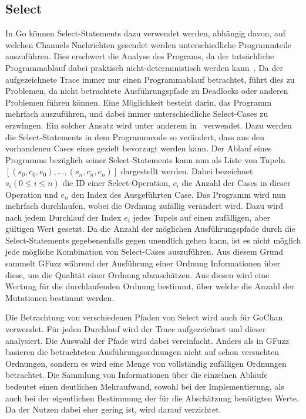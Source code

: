 \subsection{Select}\label{Chap:Back-Sec:Select}
In Go können Select-Statements dazu verwendet werden, abhängig davon, 
auf welchen Channels Nachrichten gesendet werden unterschiedliche Programmteile
auszuführen. Dies erschwert die Analyse des Programs, da der 
tatsächliche Programmablauf dabei praktisch nicht-deterministisch werden 
kann~\cite{select-spec}. Da der aufgezeichnete Trace immer nur einen 
Programmablauf betrachtet, führt dies zu Problemen, da 
nicht betrachtete Ausführungspfade zu Deadlocks oder anderen Problemen 
führen können. Eine Möglichkeit besteht darin, das Programm mehrfach auszuführen, 
und dabei immer unterschiedliche Select-Cases zu erzwingen. Ein solcher 
Ansatz wird unter anderem in~\cite{gfuzz} verwendet. Dazu werden die 
Select-Statements in dem Programmcode so verändert, dass aus den vorhandenen 
Cases eines gezielt bevorzugt werden kann.
Der Ablauf eines Programms bezüglich seiner 
Select-Statements kann nun als Liste von Tupeln 
$[(s_0, c_0, e_0), \ldots, (s_n, c_n, e_n)]$ dargestellt werden. Dabei 
bezeichnet $s_i (0 \leq i \leq n)$ die ID einer Select-Operation, $c_i$ 
die Anzahl der Cases in dieser Operation und $e_n$ den Index des Ausgeführten 
Case. Das Programm wird nun mehrfach durchlaufen, wobei die Ordnung zufällig 
verändert wird. Dazu wird nach jedem Durchlauf der Index $e_i$ jedes Tupels 
auf einen zufälligen, aber gültigen Wert gesetzt. Da die Anzahl der möglichen 
Ausführungspfade durch die Select-Statements gegebenenfalls gegen unendlich gehen kann,
ist es nicht möglich jede mögliche Kombination von Select-Cases auszuführen.
Aus diesem Grund sammelt GFuzz während der Ausführung einer Ordnung Informationen 
über diese, um die Qualität einer Ordnung abzuschätzen. Aus diesen wird 
eine Wertung für die durchlaufenden Ordnung bestimmt, über welche die 
Anzahl der Mutationen bestimmt werden. 

Die Betrachtung von verschiedenen Pfaden von Select wird auch für GoChan 
verwendet. Für jeden Durchlauf wird 
der Trace aufgezeichnet und dieser
analysiert. Die Auswahl der Pfade wird dabei vereinfacht. Anders als 
in GFuzz basieren die betrachteten Ausführungsordnungen nicht auf schon versuchten Ordnungen,
sondern es wird eine Menge von vollständig zufälligen Ordnungen betrachtet.
Die Sammlung von Informationen über die einzelnen Abläufe bedeutet einen 
deutlichen Mehraufwand, sowohl bei der Implementierung, als auch bei der eigentlichen 
Bestimmung der für die Abschätzung benötigten Werte. Da der Nutzen dabei eher gering ist,
wird darauf verzichtet.

